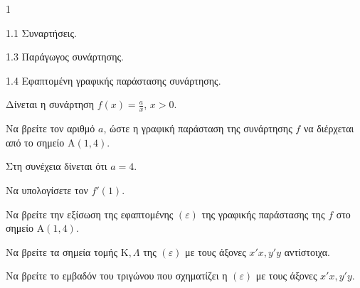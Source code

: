 \begin{ylh}{1}
    \item 1.1 Συναρτήσεις.
    \item 1.3 Παράγωγος συνάρτησης.
    \item 1.4 Εφαπτομένη γραφικής παράστασης συνάρτησης.
\end{ylh}

Δίνεται η συνάρτηση $f(x)=\frac{a}{x}$, $x>0$.

\begin{alist}
    \item Να βρείτε τον αριθμό $a$, ώστε η γραφική παράσταση της συνάρτησης $f$ να διέρχεται από το σημείο $\mathrm{A}(1,4)$.
\end{alist}

Στη συνέχεια δίνεται ότι $a=4$.

\begin{alist}[resume]
    \item
    \begin{rlist}
        \item Να υπολογίσετε τον $f'(1)$.
        \item Να βρείτε την εξίσωση της εφαπτομένης $(\varepsilon)$ της γραφικής παράστασης της $f$ στο σημείο $\mathrm{A}(1,4)$.
    \end{rlist}
    
    \item
    \begin{rlist}
        \item Να βρείτε τα σημεία τομής $\mathrm{K}, \Lambda$ της $(\varepsilon)$ με τους άξονες $x'x, y'y$ αντίστοιχα.
        \item Να βρείτε το εμβαδόν του τριγώνου που σχηματίζει η $(\varepsilon)$ με τους άξονες $x'x, y'y$.
    \end{rlist}
\end{alist}

